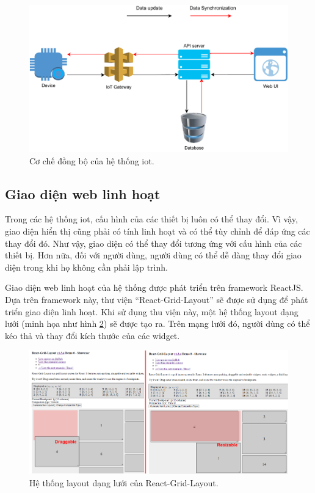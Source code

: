 \begin{figure}[htp]
\centering
\includegraphics[width=1.0\linewidth]{images/Thesis-Page-6-sync-mecha.pdf}
\caption{Cơ chế đồng bộ của hệ thống \acrshort{iot}.}
\label{fig:sync-mechani-overview}
\end{figure}

\subsection{Giao diện web linh hoạt}

Trong các hệ thống \acrshort{iot}, cấu hình của các thiết bị luôn có thể thay đổi. Vì vậy, giao diện hiển thị cũng phải có tính linh hoạt và có thể tùy chỉnh để đáp ứng các thay đổi đó. Như vậy, giao diện có thể thay đổi tương ứng với cấu hình của các thiết bị. Hơn nữa, đối với người dùng, người dùng có thể dễ dàng thay đổi giao diện trong khi họ không cần phải lập trình.

Giao diện web linh hoạt của hệ thống được phát triển trên framework ReactJS. Dựa trên framework này, thư viện ``React-Grid-Layout'' sẽ được sử dụng để phát triển giao diện linh hoạt. Khi sử dụng thu viện này, một hệ thống layout dạng lưới (minh họa như hình \ref{fig:RGL-overview}) sẽ được tạo ra. Trên mạng lưới đó, người dùng có thể kéo thả và thay đổi kích thước của các widget.

\begin{figure}[htp]
\centering
\includegraphics[width=1.0\linewidth]{images/Thesis-Page-7-RGL-Overview.png}
\caption{Hệ thống layout dạng lưới của React-Grid-Layout.}
\label{fig:RGL-overview}
\end{figure}

